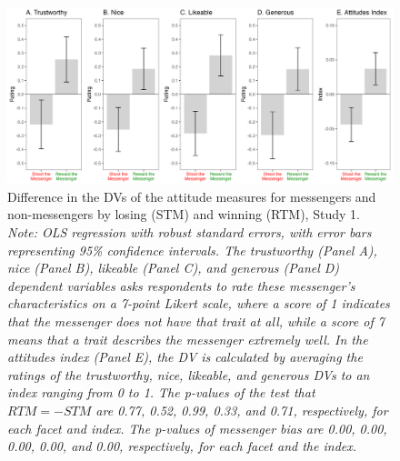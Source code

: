 \renewcommand{\baselinestretch}{1.25}%
\begin{figure}[!t]%
  \centering
  \includegraphics[width=1.0\textwidth]{figures/study1_attitude_list.png}
  \caption{Difference in the DVs of the attitude measures for messengers and non-messengers 
                                              by losing (STM) and winning (RTM), Study 1. 
  \textit{Note: OLS regression with robust standard errors, with error bars representing 95\% confidence intervals. The trustworthy (Panel A), nice (Panel B), likeable (Panel C), and generous (Panel D) dependent variables asks respondents to rate these messenger's characteristics on a 7-point Likert scale, where a score of 1 indicates that the messenger does not have that trait at all, while a score of 7 means that a trait describes the messenger extremely well.
    In the attitudes index (Panel E), the DV is calculated by averaging the ratings of the trustworthy, nice, likeable, and generous DVs to an index ranging from 0 to 1. The p-values of the test that $RTM = -STM$ are 0.77, 0.52, 0.99, 0.33, and 0.71, respectively, for each facet and index. The p-values of messenger bias are 0.00, 0.00, 0.00, 0.00, and 0.00, respectively, for each facet and the index.}}
  \label{fig:attitude_list}
\end{figure}%
\renewcommand{\baselinestretch}{1.67}%

